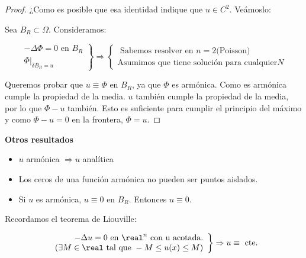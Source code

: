 		\begin{proof}

			¿Como es posible que esa identidad indique que $u \in C^2$. Veámoslo:

			Sea $B_R \subset \Omega$. Consideramos:

			\[ \left. \begin{array}{l}
				- \Delta \Phi = 0 \text{ en } B_R \\
				\Phi |_{\delta B_R = u}
			\end{array} \right\} \Rightarrow \begin{cases}
				\text{ Sabemos resolver en } n = 2 \text{(Poisson)}\\
				\text{Asumimos que tiene solución para cualquier} N
			\end{cases}
			\]

			Queremos probar que $u \equiv \Phi$ en $B_R$, ya que $\Phi$ es armónica. Como es armónica cumple la propiedad de la media. $u$ también cumple la propiedad de la media, por lo que $\Phi - u$ también. Esto es suficiente para cumplir el principio del máximo y como $\Phi -u = 0$ en la frontera, $\Phi = u$.

		\end{proof}

		\textbf{Otros resultados}

		\begin{itemize}
			\item $u$ armónica $\Rightarrow u$ analítica
			\item Los ceros de una función armónica no pueden ser puntos aislados.
			\item Si $u$ es armónica, $u \equiv 0$ en $B_R$. Entonces $u \equiv 0$.
		\end{itemize}




		Recordamos el teorema de Liouville:

		\begin{theorem}
			\[ \left. \begin{array}{r}
				-\Delta u = 0 \text{ en } \real^n \text{ con u acotada.} \\
				(\exists M \in \real \text{ tal que } - M \leq u(x) \leq M)
			\end{array} \right\} \Rightarrow u \equiv \text{ cte.} \]
		\end{theorem}

